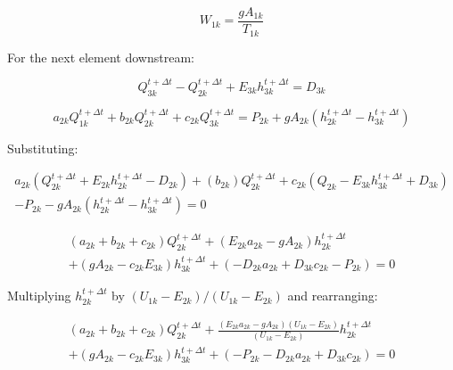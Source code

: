\documentclass[11pt]{article}
\begin{document}
\begin{equation}
  \boxed{
  W_{1k} = \frac{g A_{1k}}{T_{1k}}
  } 
\end{equation}

For the next element downstream:

\begin{equation}
  Q_{3k}^{t + \Delta t} - Q_{2k}^{t + \Delta t} + E_{3k} h_{3k}^{t + \Delta t} = D_{3k}
\end{equation}


\begin{equation}
   a_{2k} Q_{1k}^{t + \Delta t} + b_{2k} Q_{2k}^{t + \Delta t} + c_{2k} Q_{3k}^{t + \Delta t} = P_{2k} + g A_{2k} (h_{2k}^{t + \Delta t} - h_{3k}^{t + \Delta t})
\end{equation}

Substituting:

\begin{equation}
  \begin{split}
    a_{2k} (Q_{2k}^{t + \Delta t} + E_{2k} h_{2k}^{t + \Delta t}
    - D_{2k}) + (b_{2k}) Q_{2k}^{t + \Delta t} + c_{2k} (Q_{2k} - E_{3k} h_{3k}^{t + \Delta t} + D_{3k}) \\ - P_{2k} - g A_{2k}
    (h_{2k}^{t + \Delta t} - h_{3k}^{t + \Delta t}) = 0
  \end{split}
\end{equation}

\begin{equation}
  \begin{split}
    (a_{2k} + b_{2k} + c_{2k})  Q_{2k}^{t + \Delta t} + ( E_{2k} a_{2k} - g A_{2k}) h_{2k}^{t + \Delta t} \\ + (g A_{2k} - c_{2k} E_{3k}) h_{3k}^{t + \Delta t}   
    + (- D_{2k} a_{2k}   + D_{3k} c_{2k} - P_{2k}) = 0 
  \end{split}
\end{equation}

Multiplying $h_{2k}^{t + \Delta t}$ by $(U_{1k} - E_{2k}) / (U_{1k} - E_{2k})$
and rearranging:

\begin{equation}
  \begin{split}
    (a_{2k} + b_{2k} + c_{2k})  Q_{2k}^{t + \Delta t} + \frac{( E_{2k} a_{2k} - g A_{2k})(U_{1k} - E_{2k})}{(U_{1k} - E_{2k})} h_{2k}^{t + \Delta t} \\ + (g A_{2k} - c_{2k} E_{3k}) h_{3k}^{t + \Delta t}   
    + (- P_{2k} - D_{2k} a_{2k}   + D_{3k} c_{2k} ) = 0 
  \end{split}
\end{equation}
\end{document}
